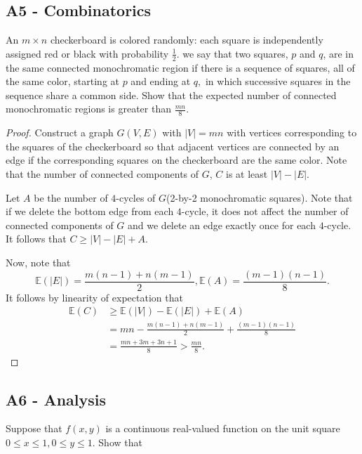 \documentclass[11pt]{scrartcl}
\newcommand{\<}{\langle}
\renewcommand{\>}{\rangle}
\begin{document}
\subsection{A5 - Combinatorics}
	An $m\times n$ checkerboard is colored randomly: each square is independently assigned red or black with probability $\frac12.$ we say that two squares, $p$ and $q$, are in the same connected monochromatic region if there is a sequence of squares, all of the same color, starting at $p$ and ending at $q,$ in which successive squares in the sequence share a common side. Show that the expected number of connected monochromatic regions is greater than $\frac{mn}8.$
\begin{proof}
Construct a graph $G(V, E)$ with $|V| = mn$ with vertices corresponding to the squares of the checkerboard so that adjacent vertices are connected by an edge if the corresponding squares on the checkerboard are the same color.  Note that the number of connected components of $G$, $C$ is at least $|V| - |E|$.

Let $A$ be the number of $4$-cycles of $G$(2-by-2 monochromatic squares).  Note that if we delete the bottom edge from each $4$-cycle, it does not affect the number of connected components of $G$ and we delete an edge exactly once for each $4$-cycle.  It follows that $C \ge |V| - |E| + A$.

Now, note that 
$$\mathbb{E}(|E|) = \frac{m(n-1) + n(m-1)}{2}, \mathbb{E}(A) = \frac{(m-1)(n-1)}{8}.$$
It follows by linearity of expectation that 
\begin{align*}
\mathbb{E}(C) &\ge \mathbb{E}(|V|) - \mathbb{E}(|E|) + \mathbb{E}(A) \\
&= mn - \frac{m(n-1) + n(m-1)}{2} +  \frac{(m-1)(n-1)}{8} \\
&= \frac{mn + 3m + 3n + 1}{8} > \frac{mn}{8}.
\end{align*}
\end{proof}
\subsection{A6 - Analysis}
Suppose that $f(x,y)$ is a continuous real-valued function on the unit square $0\le x\le1,0\le y\le1.$ Show that
\end{document}
